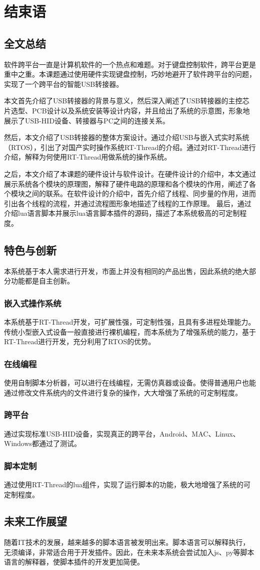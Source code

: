 
\chapter{结束语}
\section{全文总结}
软件跨平台一直是计算机软件的一个热点和难题。对于键盘控制软件，跨平台更是重中之重。本课题通过使用硬件实现键盘控制，巧妙地避开了软件跨平台的问题，实现了一个跨平台的智能USB转接器。

本文首先介绍了USB转接器的背景与意义，然后深入阐述了USB转接器的主控芯片选型、PCB设计以及系统安装等设计内容，并且给出了系统的示意图，形象地展示了USB-HID设备、转接器与PC之间的连接关系。

然后，本文介绍了USB转接器的整体方案设计。通过介绍USB与嵌入式实时系统（RTOS），引出了对国产实时操作系统RT-Thread的介绍。通过对RT-Thread进行介绍，解释为何使用RT-Thread用做系统的操作系统。

之后，本文介绍了本课题的硬件设计与软件设计。在硬件设计的介绍中，本文通过展示系统各个模块的原理图，解释了硬件电路的原理和各个模块的作用，阐述了各个模块之间的联系。在软件设计的介绍中，首先介绍了线程、同步量的作用，进而引出各个线程的流程，并通过流程图形象地描述了线程的工作原理。
最后，通过介绍lua语言脚本并展示lua语言脚本插件的源码，描述了本系统极高的可定制程度。

\section{特色与创新}
本系统基于本人需求进行开发，市面上并没有相同的产品出售，因此系统的绝大部分功能都是自主创新。
\subsection{嵌入式操作系统}
本系统基于RT-Thread开发，可扩展性强，可定制性强，且具有多进程处理能力。传统小型嵌入式设备一般直接进行裸机编程，而本系统为了增强系统的能力，基于RT-Thread进行开发，充分利用了RTOS的优势。

\subsection{在线编程}
使用自制脚本分析器，可以进行在线编程，无需仿真器或设备。使得普通用户也能通过修改文件系统内的文件进行复杂的操作，大大增强了系统的可定制程度。

\subsection{跨平台}
通过实现标准USB-HID设备，实现真正的跨平台，Android、MAC、Linux、Windows都通过了测试。

\subsection{脚本定制}
通过使用RT-Thread的lua组件，实现了运行脚本的功能，极大地增强了系统的可定制程度。

\section{未来工作展望}
随着IT技术的发展，越来越多的脚本语言被发明出来。脚本语言可以解释执行，无须编译，非常适合用于开发插件。因此，在未来本系统会尝试加入js、py等脚本语言的解释器，使脚本插件的开发更加简便。





